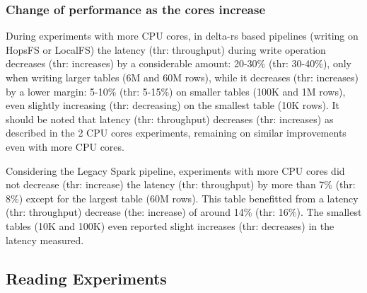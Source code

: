 \subsubsection*{Change of performance as the  cores increase}

During experiments with more \gls{CPU} cores, in delta-rs based pipelines (writing on \gls{HopsFS} or \gls{LocalFS}) the latency (thr: throughput) during write operation decreases (thr: increases) by a considerable amount: 20-30\% (thr: 30-40\%), only when writing larger tables (6M and 60M rows), while it decreases (thr: increases) by a lower margin: 5-10\% (thr: 5-15\%) on smaller tables (100K and 1M rows), even slightly increasing (thr: decreasing) on the smallest table (10K rows). It should be noted that latency (thr: throughput) decreases (thr: increases) as described in the 2 \gls{CPU} cores experiments, remaining on similar improvements even with more \gls{CPU} cores.

Considering the Legacy Spark pipeline, experiments with more \gls{CPU} cores did not decrease (thr: increase) the latency (thr: throughput) by more than 7\% (thr: 8\%) except for the largest table (60M rows). This table benefitted from a latency (thr: throughput) decrease (the: increase) of around 14\% (thr: 16\%). The smallest tables (10K and 100K) even reported slight increases (thr: decreases) in the latency measured.

\subsection{Reading Experiments}

